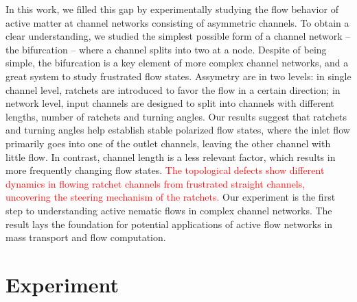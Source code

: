 \documentclass[%
10pt,
superscriptaddress,
twocolumn,
 amsmath,amssymb,
 aps,prx,
]{revtex4-2}
\newcommand{\red}[1]{\textcolor{red}{#1}}
\begin{document}


In this work, we filled this gap by experimentally studying the flow behavior of active matter at channel networks consisting of asymmetric channels. 
To obtain a clear understanding, we studied the simplest possible form of a channel network -- the bifurcation -- where a channel splits into two at a node.
Despite of being simple, the bifurcation is a key element of more complex channel networks, and a great system to study frustrated flow states.
Assymetry are in two levels: in single channel level, ratchets are introduced to favor the flow in a certain direction; in network level, input channels are designed to split into channels with different lengths, number of ratchets and turning angles.
Our results suggest that ratchets and turning angles help establish stable polarized flow states, where the inlet flow primarily goes into one of the outlet channels, leaving the other channel with little flow.
In contrast, channel length is a less relevant factor, which results in more frequently changing flow states.
\red{The topological defects show different dynamics in flowing ratchet channels from frustrated straight channels, uncovering the steering mechanism of the ratchets.}
Our experiment is the first step to understanding active nematic flows in complex channel networks.
The result lays the foundation for potential applications of active flow networks in mass transport and flow computation. 

\section{Experiment}
\end{document}
